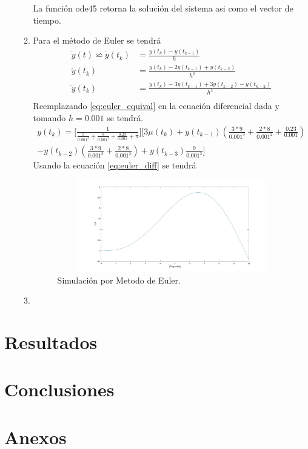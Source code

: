 \documentclass[12pt]{article}
\begin{document}
\begin{enumerate}
\begin{enumerate}
        La función ode45 retorna la solución del sistema asi como el vector de tiempo.
        \item Para el método de Euler se tendrá
        \begin{equation}
            \begin{split}
                \dot{y}(t)\backsimeq \dot{y}(t_{k})&=\frac{y(t_{k})-y(t_{k-1})}{h}\\
                \ddot{y}(t_{k})&=\frac{y(t_{k})-2y(t_{k-1})+y(t_{k-2})}{h^2}\\
                \dddot{y}(t_{k})&=\frac{y(t_{k})-3y(t_{k-1})+3y(t_{k-2})-y(t_{k-2})}{h^3}\\
            \end{split}
            \label{eq:euler_equival}
        \end{equation}
        Reemplazando \ref{eq:euler_equival} en la ecuación diferencial dada y tomando $h= 0.001$ se tendrá.
        \begin{equation}
            \begin{split}
                y(t_k)=\lbrack\frac{1}{\frac{9}{0.001^3}+\frac{8}{0.001^2}+\frac{0.23}{0.001}+\pi}\rbrack\lbrack 3\mu(t_k) +y(t_{k-1})(\frac{3*9}{0.001^3}+\frac{2*8}{0.001^2}+\frac{0.23}{0.001})\\-y(t_{k-2})(\frac{3*9}{0.001^3}+\frac{2*8}{0.001^2})+y(t_{k-3})\frac{9}{0.001^3}\rbrack
            \end{split}
            \label{eq:euler_diff}
        \end{equation}
        Usando la ecuación \ref{eq:euler_diff} se tendrá

        

        \begin{figure}[h]
            \centering
            \includegraphics[width=15cm,height=4cm]{IMAGENES/10.jpg}
            \caption{Simulación por Metodo de Euler.}
        \end{figure}
        \item 
    \end{enumerate}
\end{enumerate}
\section{Resultados}
\section{Conclusiones}
\section{Anexos}


\end{document}
